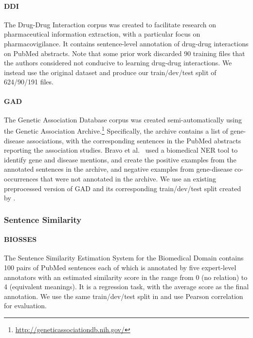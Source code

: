 \documentclass[acmlarge,screen,nonacm]{acmart}
\begin{document}
\paragraph{DDI} The Drug-Drug Interaction corpus \cite{herrero2013ddi} was created to facilitate research on pharmaceutical information extraction, with a particular focus on pharmacovigilance. It contains sentence-level annotation of drug-drug interactions on PubMed abstracts. 
Note that some prior work \cite{peng2019transfer,zhang2018drug} discarded 90 training files that the authors considered not conducive to learning drug-drug interactions. We instead use the original dataset and produce our train/dev/test split of 624/90/191 files.

\paragraph{GAD} The Genetic Association Database corpus  \cite{bravo2015extraction} was created semi-automatically using the Genetic Association Archive.\footnote{\url{http://geneticassociationdb.nih.gov/}} Specifically, the archive contains a list of gene-disease associations, with the corresponding sentences in the PubMed abstracts reporting the association studies. Bravo et al.~\cite{bravo2015extraction} used a biomedical NER tool to identify gene and disease mentions, and create the positive examples from the annotated sentences in the archive, and negative examples from gene-disease co-occurrences that were not annotated in the archive. We use an existing preprocessed version of GAD and its corresponding train/dev/test split created by \citet{lee2019bioberts}.

\subsubsection{Sentence Similarity}
\paragraph{BIOSSES} The Sentence Similarity Estimation System for the Biomedical Domain \cite{souganciouglu2017biosses} contains 100 pairs of PubMed sentences each of which is annotated by five expert-level annotators with an estimated similarity score in the range from 0 (no relation) to 4 (equivalent meanings). It is a regression task, with the average score as the final annotation.
We use the same train/dev/test split in \citet{peng2019transfer} and use Pearson correlation for evaluation.
\end{document}
